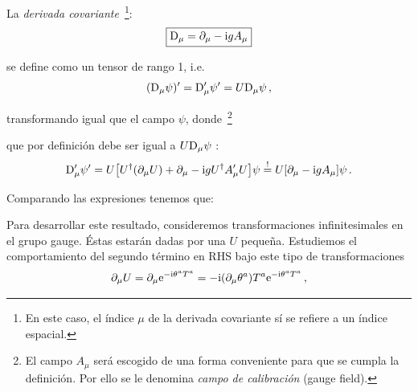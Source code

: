 La \emph{derivada covariante}~\footnote{En este caso, el índice $\mu$ de la derivada covariante sí se refiere a un índice espacial.}:
%
\begin{equation}
    \boxed{\mathrm{D}_{\mu} = \partial_\mu - \mathrm{i} g A_\mu}
\end{equation}

\noindent se define como un tensor de rango 1, i.e.
%
\begin{equation} \label{eq:trnsfD_muPsi}
    (\mathrm{D}_{\mu} \psi)' = \mathrm{D}_{\mu}' \psi' = U \mathrm{D}_{\mu} \psi\,,
\end{equation}

\noindent transformando igual que el campo $\psi$, donde~\footnote{El campo $A_\mu$ será escogido de una forma conveniente para que se cumpla la definición. Por ello se le denomina \emph{campo de calibración} (gauge field).}
%

\noindent que por definición debe ser igual a $U\mathrm{D}_{\mu} \psi$ :
%
\begin{equation}
    \mathrm{D}_{\mu}' \psi' = U\qty[U^{\dag} (\partial_\mu U) + \partial_\mu - \mathrm{i} g U^{\dag} A'_\mu U] \psi \overset{!}{=} U \qty[\partial_\mu - \mathrm{i} g A_\mu] \psi\,.
\end{equation}

Comparando las expresiones tenemos que:
%


Para desarrollar este resultado, consideremos transformaciones infinitesimales en el grupo gauge. Éstas estarán dadas por una $U$ pequeña. Estudiemos el comportamiento del segundo término en RHS bajo este tipo de transformaciones
%
\begin{equation} \label{eq:trPartial_muU-Inf_1}
    \partial_\mu U = \partial_\mu \mathrm{e}^{-\mathrm{i} \theta^a T^a} = -\mathrm{i} \qty(\partial_\mu \theta^a) T^a \mathrm{e}^{-\mathrm{i} \theta^a T^a} \,,
\end{equation}

